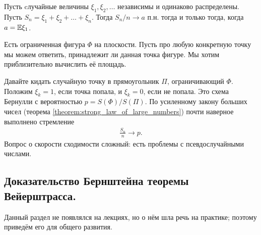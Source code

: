 \documentclass[../main.tex]{subfiles}
\begin{document}
\begin{thm}
Пусть cлучайные величины $ \xi_1, \xi_2, \ldots $  независимы и одинаково распределены. Пусть $ S_n  = \xi_1 + \xi_2 + \ldots + \xi_n $. Тогда $ S_n/n \to a $ п.н. тогда и только тогда, когда $ a = \mathbb E \xi_1 $.
\end{thm}

\begin{exmpl}
 Есть ограниченная фигура $ \Phi $ на плоскости. Пусть про любую конкретную точку мы можем ответить, принадлежит ли данная точка фигуре. Мы хотим приблизительно вычислить её площадь.

 Давайте кидать случайную точку в прямоугольник $ \Pi $, ограничивающий $ \Phi $. Положим $ \xi_k = 1 $, если точка попала, и $ \xi_k = 0 $, если не попала. Это схема Бернулли с вероятностью $ p = S(\Phi)/S(\Pi) $. По усиленному закону больших чисел (теорема \ref{theorem:strong_law_of_large_numbers}) почти наверное выполнено стремление
 \begin{align*}
  \frac{S_n}{n} \to p.
 \end{align*} Вопрос о скорости сходимости сложный: есть проблемы с псевдослучайными числами.
\end{exmpl}

\subsection{Доказательство Бернштейна теоремы Вейерштрасса.}

Данный раздел не появлялся на лекциях, но о нём шла речь на практике; поэтому приведём его для общего развития.
\end{document}
